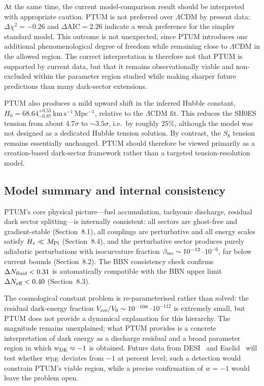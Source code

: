 \documentclass[epj]{svjour}
\begin{document}
At the same time, the current model-comparison result should be
interpreted with appropriate caution. PTUM is not preferred over
$\Lambda$CDM by present data:
$\Delta\chi^2=-0.26$ and $\Delta\mathrm{AIC}=2.26$ indicate a
weak preference for the simpler standard model. This outcome is not
unexpected, since PTUM introduces one additional phenomenological
degree of freedom while remaining close to $\Lambda$CDM in the
allowed region. The correct interpretation is therefore not that
PTUM is supported by current data, but that it remains observationally viable
and non-excluded within the parameter region studied while making sharper future
predictions than many dark-sector extensions.

PTUM also produces a mild upward shift in the inferred Hubble
constant,
$H_0 = 68.64^{+0.55}_{-0.87}\,\mathrm{km\,s^{-1}\,Mpc^{-1}}$,
relative to the $\Lambda$CDM fit. This reduces the SH0ES tension
from about $4.7\sigma$ to $\sim3.5\sigma$, i.e.\ by roughly
25\%, although the model was not designed as a dedicated Hubble
tension solution. By contrast, the $S_8$ tension remains
essentially unchanged. PTUM should therefore be viewed primarily as
a creation-based dark-sector framework rather than a targeted
tension-resolution model.

\subsection{Model summary and internal consistency}
\label{sec:summary}

PTUM's core physical picture---fuel accumulation, tachyonic
discharge, residual dark sector splitting---is internally consistent:
all sectors are ghost-free and gradient-stable (Section~8.1),
all couplings are perturbative and all energy scales satisfy
$H_*\ll M_{\rm Pl}$ (Section~8.4), and the perturbative sector
produces purely adiabatic perturbations with isocurvature fraction
$\beta_{\rm iso}\sim10^{-12}$--$10^{-6}$, far below current bounds
(Section~8.2). The BBN consistency check confirms
$\Delta N_{\rm fluid}<0.31$ is automatically compatible with the
BBN upper limit $\Delta N_{\rm eff}<0.40$ (Section~8.3).

The cosmological constant problem is re-parameterised rather than
solved: the residual dark-energy fraction
$V_{\rm res}/V_0\sim10^{-108}$--$10^{-112}$ is extremely small,
but PTUM does not provide a dynamical explanation for this hierarchy.
The magnitude remains unexplained; what PTUM provides is a concrete
interpretation of dark energy as a discharge residual and a broad parameter
region in which $w_{\rm DE}\approx-1$ is obtained.
Future data from DESI~\cite{DESI2024} and Euclid~\cite{Euclid2024}
will test whether $w_{\rm DE}$ deviates from $-1$ at percent level;
such a detection would constrain PTUM's viable region, while a
precise confirmation of $w=-1$ would leave the problem open.
\end{document}
